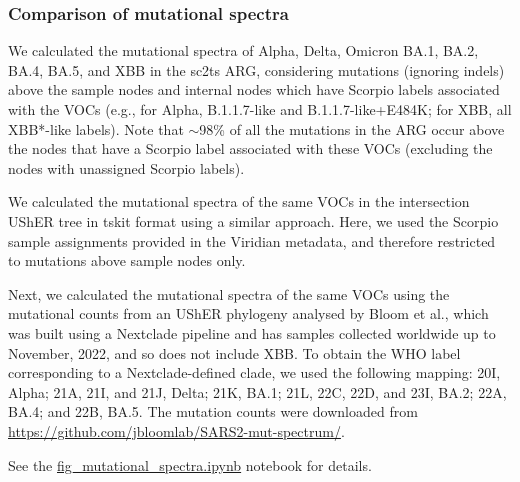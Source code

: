 \documentclass[12pt]{article}
\begin{document}
\subsubsection*{Comparison of mutational spectra}

We calculated the mutational spectra of Alpha, Delta, Omicron BA.1, BA.2, BA.4, BA.5, and XBB
in the sc2ts ARG, considering mutations (ignoring indels) above the sample
nodes and internal nodes
which have Scorpio labels associated with the VOCs
(e.g., for Alpha, B.1.1.7-like and B.1.1.7-like+E484K;
for XBB, all XBB*-like labels).
Note that $\sim$98\% of all the mutations in the ARG occur
above the nodes that have a Scorpio label associated with these VOCs
(excluding the nodes with unassigned Scorpio labels).

We calculated the mutational spectra of the same VOCs
in the intersection UShER tree in tskit format using a similar approach.
Here, we used the Scorpio sample assignments provided in the Viridian metadata,
and therefore restricted to mutations above sample nodes only.

Next, we calculated the mutational spectra of the same VOCs
using the mutational counts from an UShER phylogeny
analysed by Bloom et al.\cite{Bloom2023},
which was built using a Nextclade pipeline and
has samples collected worldwide up to November, 2022,
and so does not include XBB.
To obtain the WHO label corresponding to a Nextclade-defined clade, we used the following mapping:
20I, Alpha; 21A, 21I, and 21J, Delta; 21K, BA.1; 21L, 22C, 22D, and 23I, BA.2; 22A, BA.4; and 22B, BA.5.
The mutation counts were downloaded from
\url{https://github.com/jbloomlab/SARS2-mut-spectrum/}.

See the
\href{https://github.com/jeromekelleher/sc2ts-paper/blob/main/notebooks/fig\_mutational\_spectra.ipynb}{fig\_mutational\_spectra.ipynb}
notebook for details.
\end{document}
